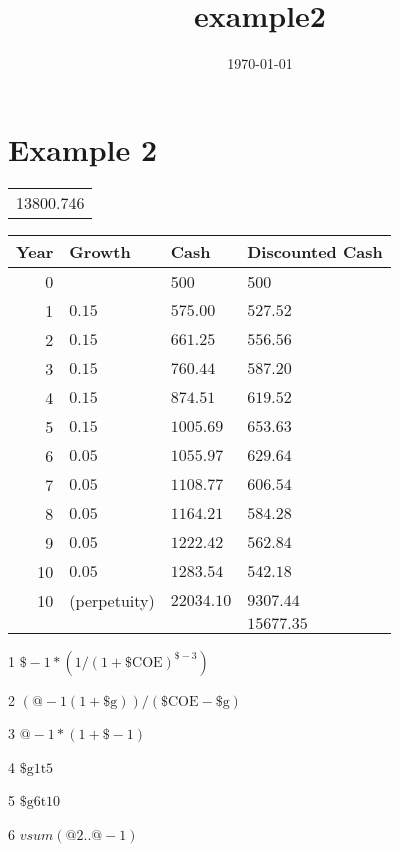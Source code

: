 \documentclass[11pt]{article}
\date{\today}
\title{example2}
\begin{document}
\maketitle
\tableofcontents

\section{Example 2}
\label{sec-1}

\begin{tabular}{r}
13800.746\\
\end{tabular}

\begin{table}
\centering
\begin{threeparttable}
\begin{tabular}{rlll}
Year & Growth & Cash & Discounted Cash\\
\hline
0 &  & 500 & 500\\
1 & \(0.15\)\tnote{4} & \(575.00\)\tnote{3} & \(527.52\)\tnote{1}\\
2 & \(0.15\)\tnote{4} & \(661.25\)\tnote{3} & \(556.56\)\tnote{1}\\
3 & \(0.15\)\tnote{4} & \(760.44\)\tnote{3} & \(587.20\)\tnote{1}\\
4 & \(0.15\)\tnote{4} & \(874.51\)\tnote{3} & \(619.52\)\tnote{1}\\
5 & \(0.15\)\tnote{4} & \(1005.69\)\tnote{3} & \(653.63\)\tnote{1}\\
6 & \(0.05\)\tnote{5} & \(1055.97\)\tnote{3} & \(629.64\)\tnote{1}\\
7 & \(0.05\)\tnote{5} & \(1108.77\)\tnote{3} & \(606.54\)\tnote{1}\\
8 & \(0.05\)\tnote{5} & \(1164.21\)\tnote{3} & \(584.28\)\tnote{1}\\
9 & \(0.05\)\tnote{5} & \(1222.42\)\tnote{3} & \(562.84\)\tnote{1}\\
10 & \(0.05\)\tnote{5} & \(1283.54\)\tnote{3} & \(542.18\)\tnote{1}\\
10 & (perpetuity) & \(22034.10\)\tnote{2} & \(9307.44\)\tnote{1}\\
 &  &  & \(15677.35\)\tnote{6}\\
\end{tabular}

\begin{tablenotes}
\item [1] \(\$-1*(1/(1+\mbox{\$COE})^{\$-3})\)
\item [2] \((@-1(1+\mbox{\$g}))/(\mbox{\$COE}-\mbox{\$g})\)
\item [3] \(@-1*(1+\$-1)\)
\item [4] \(\mbox{\$g1t5}\)
\item [5] \(\mbox{\$g6t10}\)
\item [6] \(vsum(@2..@-1)\)
\end{tablenotes}

\end{threeparttable}
\end{table}
\end{document}
